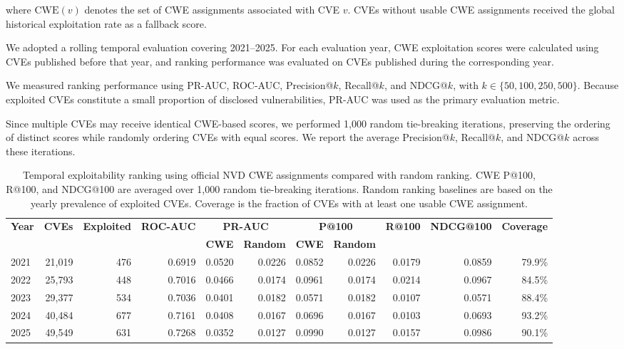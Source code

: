 \documentclass[conference,compsoc]{IEEEtran}
\begin{document}
where $\mathrm{CWE}(v)$ denotes the set
of CWE assignments associated with CVE $v$.
CVEs without usable CWE assignments received
the global historical exploitation rate
as a fallback score.

We adopted a rolling temporal evaluation
covering 2021--2025. For each evaluation
year, CWE exploitation scores were calculated
using CVEs published before that year, and
ranking performance was evaluated on CVEs
published during the corresponding year.

We measured ranking performance using
PR-AUC, ROC-AUC, Precision@$k$,
Recall@$k$, and NDCG@$k$, with
$k \in \{50,100,250,500\}$. Because
exploited CVEs constitute a small proportion
of disclosed vulnerabilities, PR-AUC was
used as the primary evaluation metric.

Since multiple CVEs may receive identical
CWE-based scores, we performed 1,000 random
tie-breaking iterations, preserving the
ordering of distinct scores while randomly
ordering CVEs with equal scores. We report
the average Precision@$k$, Recall@$k$,
and NDCG@$k$ across these iterations.

\begin{table}[t]
\centering
\caption{Temporal exploitability ranking using official NVD CWE
assignments compared with random ranking. CWE P@100, R@100,
and NDCG@100 are averaged over 1,000 random tie-breaking
iterations. Random ranking baselines are based on the
yearly prevalence of exploited CVEs. Coverage is the fraction
of CVEs with at least one usable CWE assignment.}
\label{tab:cwe_ranking}
\scriptsize
\begin{tabular}{lrrrrrrrrrr}
\toprule
\textbf{Year} &
\textbf{CVEs} &
\textbf{Exploited} &
\textbf{ROC-AUC} &
\multicolumn{2}{c}{\textbf{PR-AUC}} &
\multicolumn{2}{c}{\textbf{P@100}} &
\textbf{R@100} &
\textbf{NDCG@100} &
\textbf{Coverage} \\
\cmidrule(lr){5-6}
\cmidrule(lr){7-8}
& & & & \textbf{CWE} & \textbf{Random}
& \textbf{CWE} & \textbf{Random} & & & \\
\midrule
2021 & 21,019 & 476 & 0.6919 & 0.0520 & 0.0226 & 0.0852 & 0.0226 & 0.0179 & 0.0859 & 79.9\% \\
2022 & 25,793 & 448 & 0.7016 & 0.0466 & 0.0174 & 0.0961 & 0.0174 & 0.0214 & 0.0967 & 84.5\% \\
2023 & 29,377 & 534 & 0.7036 & 0.0401 & 0.0182 & 0.0571 & 0.0182 & 0.0107 & 0.0571 & 88.4\% \\
2024 & 40,484 & 677 & 0.7161 & 0.0408 & 0.0167 & 0.0696 & 0.0167 & 0.0103 & 0.0693 & 93.2\% \\
2025 & 49,549 & 631 & 0.7268 & 0.0352 & 0.0127 & 0.0990 & 0.0127 & 0.0157 & 0.0986 & 90.1\% \\
\bottomrule
\end{tabular}
\end{table}
\end{document}
